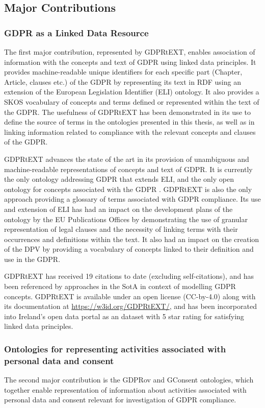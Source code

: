\subsection*{Major Contributions}
\subsubsection*{GDPR as a Linked Data Resource}
The first major contribution, represented by GDPRtEXT, enables association of information with the concepts and text of GDPR using linked data principles. It provides machine-readable unique identifiers for each specific part (Chapter, Article, clauses etc.) of the GDPR by representing its text in RDF using an extension of the European Legislation Identifier (ELI) ontology. It also provides a SKOS vocabulary of concepts and terms defined or represented within the text of the GDPR. The usefulness of GDPRtEXT has been demonstrated in its use to define the source of terms in the ontologies presented in this thesis, as well as in linking information related to compliance with the relevant concepts and clauses of the GDPR.

GDPRtEXT advances the state of the art in its provision of unambiguous and machine-readable representations of concepts and text of GDPR.
It is currently the only ontology addressing GDPR that extends ELI, and the only open ontology for concepts associated with the GDPR \cite{leone_taking_2019}.
GDPRtEXT is also the only approach providing a glossary of terms associated with GDPR compliance.
Its use and extension of ELI has had an impact on the development plans of the ontology by the EU Publications Offices by demonstrating the use of granular representation of legal clauses and the necessity of linking terms with their occurrences and definitions within the text.
It also had an impact on the creation of the DPV by providing a vocabulary of concepts linked to their definition and use in the GDPR.

GDPRtEXT has received 19 citations to date (excluding self-citations), and has been referenced by approaches in the SotA in context of modelling GDPR concepts.
GDPRtEXT is available under an open license (CC-by-4.0) along with its documentation at 
\url{https://w3id.org/GDPRtEXT/}, and has been incorporated into Ireland's open data portal as an dataset with 5 star rating for satisfying linked data principles.

\subsubsection*{Ontologies for representing activities associated with personal data and consent}
The second major contribution is the GDPRov and GConsent ontologies, which together enable representation of information about activities associated with personal data and consent relevant for investigation of GDPR compliance.

